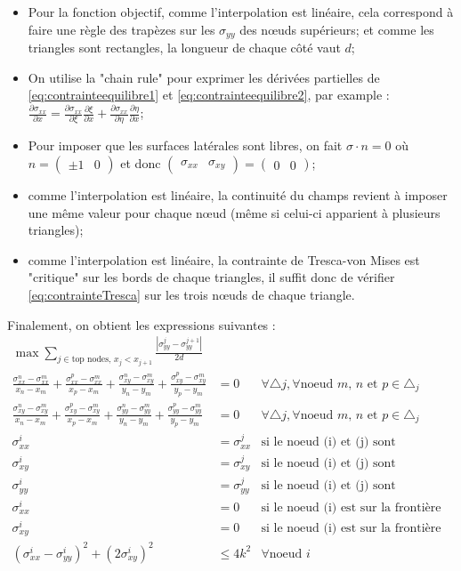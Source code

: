 \begin{itemize}
\item  Pour la fonction objectif, comme l'interpolation est linéaire, cela correspond à faire une règle des trapèzes sur les $\sigma_{yy}$ des nœuds supérieurs; et comme les triangles sont rectangles, la longueur de chaque côté vaut $d$;
\item  On utilise la "chain rule" pour exprimer les dérivées partielles de \eqref{eq:contrainteequilibre1} et \eqref{eq:contrainteequilibre2}, par example : $\frac{\partial \sigma_{xx}}{\partial x} = \frac{\partial \sigma_{xx}}{\partial \xi} \frac{\partial \xi}{\partial x} + \frac{\partial \sigma_{xx}}{\partial \eta} \frac{\partial \eta}{\partial x}$;
\item Pour imposer que les surfaces latérales sont libres, on fait $\sigma \cdot n = 0 $ où 
$n=\begin{pmatrix}
± 1 & 0
\end{pmatrix}$ et donc $\begin{pmatrix}
\sigma_{xx} & \sigma_{xy}
\end{pmatrix} = \begin{pmatrix}
0 &0
\end{pmatrix}$;
\item comme l'interpolation est linéaire, la continuité du champs revient à imposer une même valeur pour chaque nœud (même si celui-ci apparient à plusieurs triangles);
\item comme l'interpolation est linéaire, la contrainte de Tresca-von Mises est "critique" sur les bords de chaque triangles, il suffit donc de vérifier \eqref{eq:contrainteTresca} sur les trois nœuds de chaque triangle. 
\end{itemize}
Finalement, on obtient les expressions suivantes : 
\begin{align}
\max \sum_{j \in \text{top nodes, $x_j < x_{j+1}$}} \frac{|\sigma_{yy}^j - \sigma_{yy}^{j+1}|}{2 d } & \\
\frac{\sigma_{xx}^n - \sigma_{xx}^m}{x_n - x_m}  + \frac{\sigma_{xx}^p - \sigma_{xx}^m}{x_p - x_m} + \frac{\sigma_{xy}^n - \sigma_{xy}^m}{y_n - y_m} + \frac{\sigma_{xy}^p - \sigma_{xy}^m}{y_p - y_m} &= 0  & \forall \triangle j, \forall \text{noeud $m$, $n$ et $p$} \in \triangle_j \\
\frac{\sigma_{xy}^n - \sigma_{xy}^m}{x_n - x_m}  + \frac{\sigma_{xy}^p - \sigma_{xy}^m}{x_p - x_m} + \frac{\sigma_{yy}^n - \sigma_{yy}^m}{y_n - y_m} + \frac{\sigma_{yy}^p - \sigma_{yy}^m}{y_p - y_m} &= 0  & \forall \triangle j, \forall \text{noeud $m$, $n$ et $p$} \in \triangle_j \\
\sigma_{xx}^i &= \sigma_{xx}^j & \text{si le noeud (i) et (j) sont confondus}\\
\sigma_{xy}^i &= \sigma_{xy}^j & \text{si le noeud (i) et (j) sont confondus}\\
\sigma_{yy}^i &= \sigma_{yy}^j & \text{si le noeud (i) et (j) sont confondus}\\
\sigma_{xx}^i &= 0 & \text{si le noeud (i) est sur la frontière} \\
\sigma_{xy}^i &= 0 & \text{si le noeud (i) est sur la frontière}\\
(\sigma_{xx}^i - \sigma_{yy}^i)^2 + (2 \sigma_{xy}^i)^2 & \leq 4 k^2 & \forall \text{noeud $i$}
\end{align}

